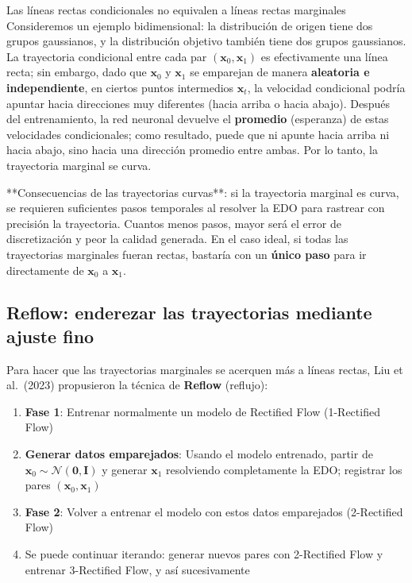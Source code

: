 \documentclass[a4paper]{article}
\begin{document}
\begin{warningbox}{Las líneas rectas condicionales no equivalen a líneas rectas marginales}
Consideremos un ejemplo bidimensional: la distribución de origen tiene dos grupos gaussianos, y la distribución objetivo también tiene dos grupos gaussianos. La trayectoria condicional entre cada par $(\mathbf{x}_0, \mathbf{x}_1)$ es efectivamente una línea recta; sin embargo, dado que $\mathbf{x}_0$ y $\mathbf{x}_1$ se emparejan de manera \textbf{aleatoria e independiente}, en ciertos puntos intermedios $\mathbf{x}_t$, la velocidad condicional podría apuntar hacia direcciones muy diferentes (hacia arriba o hacia abajo). Después del entrenamiento, la red neuronal devuelve el \textbf{promedio} (esperanza) de estas velocidades condicionales; como resultado, puede que ni apunte hacia arriba ni hacia abajo, sino hacia una dirección promedio entre ambas. Por lo tanto, la trayectoria marginal se curva.
\end{warningbox}

**Consecuencias de las trayectorias curvas**: si la trayectoria marginal es curva, se requieren suficientes pasos temporales al resolver la EDO para rastrear con precisión la trayectoria. Cuantos menos pasos, mayor será el error de discretización y peor la calidad generada. En el caso ideal, si todas las trayectorias marginales fueran rectas, bastaría con un \textbf{único paso} para ir directamente de $\mathbf{x}_0$ a $\mathbf{x}_1$.

\subsection{Reflow: enderezar las trayectorias mediante ajuste fino}

Para hacer que las trayectorias marginales se acerquen más a líneas rectas, Liu et al.\ (2023) propusieron la técnica de \textbf{Reflow} (reflujo):

\begin{enumerate}
    \item \textbf{Fase 1}: Entrenar normalmente un modelo de Rectified Flow (1-Rectified Flow)
    \item \textbf{Generar datos emparejados}: Usando el modelo entrenado, partir de $\mathbf{x}_0 \sim \mathcal{N}(\mathbf{0}, \mathbf{I})$ y generar $\mathbf{x}_1$ resolviendo completamente la EDO; registrar los pares $(\mathbf{x}_0, \mathbf{x}_1)$
    \item \textbf{Fase 2}: Volver a entrenar el modelo con estos datos emparejados (2-Rectified Flow)
    \item Se puede continuar iterando: generar nuevos pares con 2-Rectified Flow y entrenar 3-Rectified Flow, y así sucesivamente
\end{enumerate}
\end{document}
